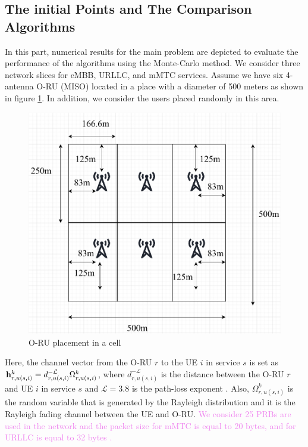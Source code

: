 \documentclass[lettersize,journal]{IEEEtran}
\begin{document}
\subsection{The initial Points and The Comparison Algorithms}
In this part, numerical results for the main problem are depicted to evaluate the performance of the algorithms using the Monte-Carlo method. We consider three network slices for eMBB, URLLC, and mMTC services.
Assume we have six 4-antenna O-RU (MISO) located in a place with a diameter of 500 meters as shown in figure \ref{fig:cell}. In addition, we consider the users placed randomly in this area.
\begin{figure}
  \centering 
    \includegraphics[scale = 0.3]{cell.pdf}
  \caption{O-RU placement in a cell}
  \label{fig:cell}
\end{figure}
Here, the channel vector from the O-RU $r$ to the UE $i$ in service $s$ is set as $\bold{h}_{r,u(s,i)}^{k}=d_{r,u(s,i)}^{-\mathcal{L}} \Omega_{r,u(s,i)}^{k} $, where $d_{r,u(s,i)}^{-\mathcal{L}} $ is the distance between the O-RU $r$ and UE $i$ in service $s$ and $\mathcal{L} = 3.8$ is the path-loss exponent \cite{gholipoor2020cloud}.
Also, $\Omega_{r,u(s,i)}^{k}$ is the random variable that is generated by the Rayleigh distribution and it is the Rayleigh fading channel between the UE and O-RU.
\textcolor{Violet}{We consider 25 PRBs are used in the network and the packet size for mMTC is equal to 20 bytes, and for URLLC is equal to 32 bytes \cite{ETSI1}.}
\end{document}
